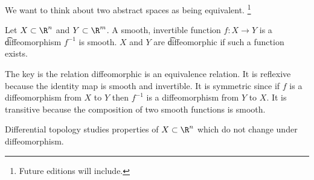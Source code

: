 

We want to think about two abstract spaces as being equivalent.
\footnote{Future editions will include.}


Let $X \subset \R^n$ and $Y \subset \R^m$.
A smooth, invertible function $f: X \to Y$ is a \t{diffeomorphism} $f^{-1}$ is smooth.
$X$ and $Y$ are \t{diffeomorphic} if such a function exists.

The key is the relation diffeomorphic is an equivalence relation.
It is reflexive because the identity map is smooth and invertible.
It is symmetric since if $f$ is a diffeomorphism from $X$ to $Y$ then $f^{-1}$ is a diffeomorphism from $Y$ to $X$.
It is transitive because the composition of two smooth functions is smooth.


Differential topology studies properties of $X \subset \R^n$ which do not change under diffeomorphism.

\blankpage
